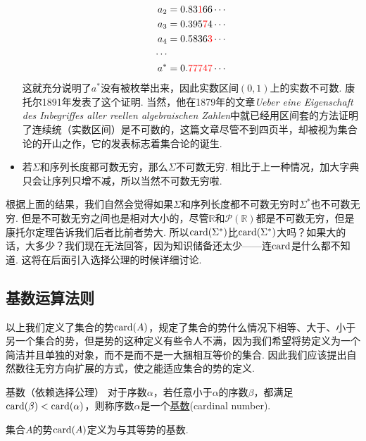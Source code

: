 \documentclass[main.tex]{subfiles}
\begin{document}
\begin{itemize}
\begin{note}
\begin{align*}
            a_2 &= 0.83{\color{red}1} 66\cdots \\
            a_3 &= 0.395{\color{red}7} 4\cdots \\
            a_4 &= 0.5836{\color{red}3}\cdots \\
            \cdots \\
            a^* &= 0.{\color{red}77747}\cdots
        \end{align*}
        这就充分说明了\(a^*\)没有被枚举出来，因此实数区间\((0,1)\)上的实数不可数. 康托尔1891年发表了这个证明. 当然，他在1879年的文章\textit{Ueber eine Eigenschaft des Inbegriffes aller reellen algebraischen Zahlen}中就已经用区间套的方法证明了连续统（实数区间）是不可数的，这篇文章尽管不到四页半，却被视为集合论的开山之作，它的发表标志着集合论的诞生.
    \end{note}
    \item 若\(\Sigma\)和序列长度都可数无穷，那么\(\Sigma\)不可数无穷. \newline
    相比于上一种情况，加大字典只会让序列只增不减，所以当然不可数无穷啦.
\end{itemize}

根据上面的结果，我们自然会觉得如果\(\Sigma\)和序列长度都不可数无穷时\(\Sigma^*\)也不可数无穷. 但是不可数无穷之间也是相对大小的，尽管\(\mathbb{R}\)和\(\mathcal{P}(\mathbb{R})\)都是不可数无穷，但是康托尔定理告诉我们后者比前者势大. 所以\({\rm card}(\Sigma^*)\)比\({\rm card}(\Sigma^*)\)大吗？如果大的话，大多少？我们现在无法回答，因为知识储备还太少——连\({\rm card}\)是什么都不知道. 这将在后面引入选择公理的时候详细讨论.

\subsection{基数运算法则}

以上我们定义了集合的势\({\rm card}(A)\)，规定了集合的势什么情况下相等、大于、小于另一个集合的势，但是势的这种定义有些令人不满，因为我们希望将势定义为一个简洁并且单独的对象，而不是而不是一大捆相互等价的集合. 因此我们应该提出自然数往无穷方向扩展的方式，使之能适应集合的势的定义.

\begin{definition}{基数（依赖选择公理）}
    对于序数\(\alpha\)，若任意小于\(\alpha\)的序数\(\beta\)，都满足\({\rm card}(\beta)<{\rm card}(\alpha)\)，则称序数\(\alpha\)是一个\uline{基数}(cardinal number).
    \par
    集合\(A\)的势\({\rm card}(A)\)定义为与其等势的基数.
\end{definition}
\end{document}
